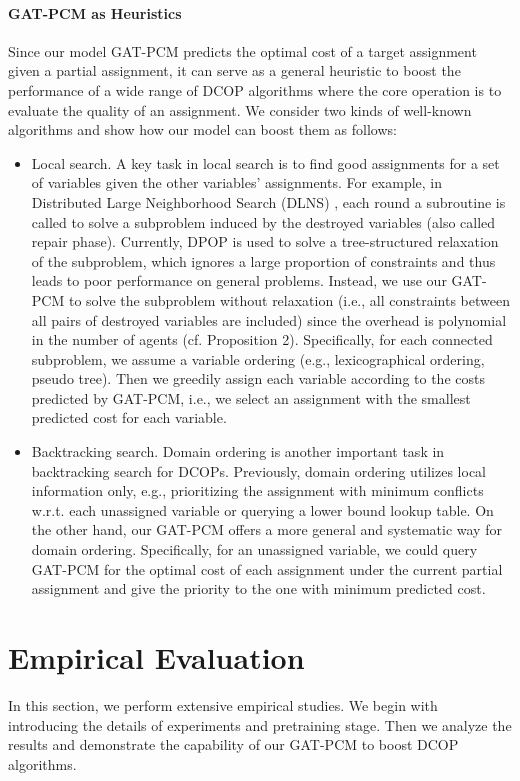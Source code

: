 \documentclass[letterpaper]{article} %
\begin{document}
\paragraph{GAT-PCM as Heuristics}
Since our model GAT-PCM predicts the optimal cost of a target assignment given a partial assignment, it can serve as a general heuristic to boost the performance of a wide range of DCOP algorithms where the core operation is to evaluate the quality of an assignment. We consider two kinds of well-known algorithms and show how our model can boost them as follows:
\begin{itemize}
    \item Local search. A key task in local search is to find good assignments for a set of variables given the other variables' assignments. For example, in Distributed Large Neighborhood Search (DLNS) \cite{hoang2018large} , each round a subroutine is called to solve a subproblem induced by the destroyed variables (also called repair phase). Currently, DPOP \cite{petcuscalable} is used to solve a tree-structured relaxation of the subproblem, which ignores a large proportion of constraints and thus leads to poor performance on general problems.
    Instead, we use our GAT-PCM to solve the subproblem without relaxation (i.e., all constraints between all pairs of destroyed variables are included) since the overhead is polynomial in the number of agents (cf. Proposition 2). Specifically, for each connected subproblem, we assume a variable ordering (e.g., lexicographical ordering, pseudo tree). Then we greedily assign each variable according to the costs predicted by GAT-PCM, i.e., we select an assignment with the smallest predicted cost for each variable.

    \item Backtracking search. Domain ordering is another important task in backtracking search for DCOPs. Previously, domain ordering utilizes local information only, e.g., prioritizing the assignment with minimum conflicts w.r.t. each unassigned variable \cite{frost1995look} or querying a lower bound lookup table. On the other hand, our GAT-PCM offers a more general and systematic way for domain ordering. Specifically, for an unassigned variable, we could query GAT-PCM for the optimal cost of each assignment under the current partial assignment and give the priority to the one with minimum predicted cost.
\end{itemize}

\section{Empirical Evaluation}
In this section, we perform extensive empirical studies. We begin with introducing the details of experiments and pretraining stage. Then we analyze the results and demonstrate the capability of our GAT-PCM to boost DCOP algorithms.
\end{document}
